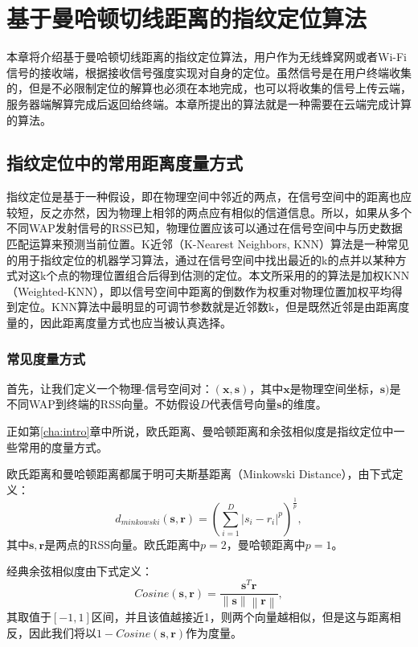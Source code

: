 \chapter{基于曼哈顿切线距离的指纹定位算法}
\label{cha:fingerprint}

本章将介绍基于曼哈顿切线距离的指纹定位算法，用户作为无线蜂窝网或者Wi-Fi信号的接收端，根据接收信号强度实现对自身的定位。虽然信号是在用户终端收集的，但是不必限制定位的解算也必须在本地完成，也可以将收集的信号上传云端，服务器端解算完成后返回给终端。本章所提出的算法就是一种需要在云端完成计算的算法。

\section{指纹定位中的常用距离度量方式}

指纹定位是基于一种假设，即在物理空间中邻近的两点，在信号空间中的距离也应较短，反之亦然，因为物理上相邻的两点应有相似的信道信息。所以，如果从多个不同WAP发射信号的RSS已知，物理位置应该可以通过在信号空间中与历史数据匹配运算来预测当前位置。K近邻（K-Nearest Neighbors, KNN）算法是一种常见的用于指纹定位的机器学习算法，通过在信号空间中找出最近的k的点并以某种方式对这k个点的物理位置组合后得到估测的定位。本文所采用的的算法是加权KNN（Weighted-KNN），即以信号空间中距离的倒数作为权重对物理位置加权平均得到定位。KNN算法中最明显的可调节参数就是近邻数k，但是既然近邻是由距离度量的，因此距离度量方式也应当被认真选择。

\subsection{常见度量方式}

首先，让我们定义一个物理-信号空间对：$(\mathbf{x}, \mathbf{s})$，其中$\mathbf{x}$是物理空间坐标，$\mathbf{s})$是不同WAP到终端的RSS向量。不妨假设$D$代表信号向量$\mathbf{s}$的维度。

正如第\ref{cha:intro}章中所说，欧氏距离、曼哈顿距离和余弦相似度是指纹定位中一些常用的度量方式。

欧氏距离和曼哈顿距离都属于明可夫斯基距离（Minkowski Distance），由下式定义：
\begin{equation}
d_{minkowski}(\mathbf{s}, \mathbf{r}) = \left(\sum_{i=1}^{D} {{\left| s_i - r_i \right|}^p}\right)^{\frac{1}{p}}, \label{eq:minkowski}
\end{equation}
其中$\mathbf{s}, \mathbf{r}$是两点的RSS向量。欧氏距离中$p=2$，曼哈顿距离中$p=1$。

经典余弦相似度由下式定义：
\begin{equation}
Cosine(\mathbf{s}, \mathbf{r}) = \frac{\mathbf{s}^T\mathbf{r}}{\left\|\mathbf{s}\right\|\left\|\mathbf{r}\right\|}, \label{eq:cosine}
\end{equation}
其取值于$[-1, 1]$区间，并且该值越接近1，则两个向量越相似，但是这与距离相反，因此我们将以$1 - Cosine(\mathbf{s}, \mathbf{r})$作为度量。

